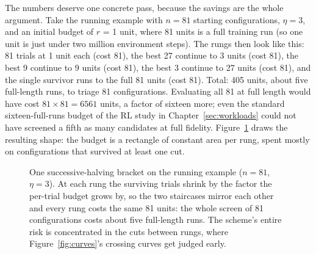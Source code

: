 The numbers deserve one concrete pass, because the savings are the whole
argument. Take the running example with $n = 81$ starting configurations,
$\eta = 3$, and an initial budget of $r$ = 1 unit, where 81 units is a
full training run (so one unit is just under two million environment
steps). The rungs then look like this:
81 trials at 1 unit each (cost 81), the best 27 continue to 3 units
(cost 81), the best 9 continue to 9 units (cost 81), the best 3 continue
to 27 units (cost 81), and the single survivor runs to the full 81 units
(cost 81). Total: 405 units, about five full-length runs, to triage 81
configurations. Evaluating all 81 at full length would have cost
$81 \times 81 = 6561$ units, a factor of sixteen more; even the standard
sixteen-full-runs budget of the RL study in
Chapter~\ref{sec:workloads} could not have screened a fifth as many
candidates at full fidelity. Figure~\ref{fig:sh} draws the resulting
shape: the budget is a rectangle of constant area per rung, spent mostly
on configurations that survived at least one cut.

\begin{figure}[t]
\centering
{}
\caption{One successive-halving bracket on the running example
($n = 81$, $\eta = 3$). At each rung the surviving trials shrink by the
factor the per-trial budget grows by, so the two staircases mirror each
other and every rung costs the same 81 units: the whole screen of 81
configurations costs about five full-length runs. The scheme's entire
risk is concentrated in the cuts between rungs, where
Figure~\ref{fig:curves}'s crossing curves get judged early.}
\label{fig:sh}
\end{figure}

